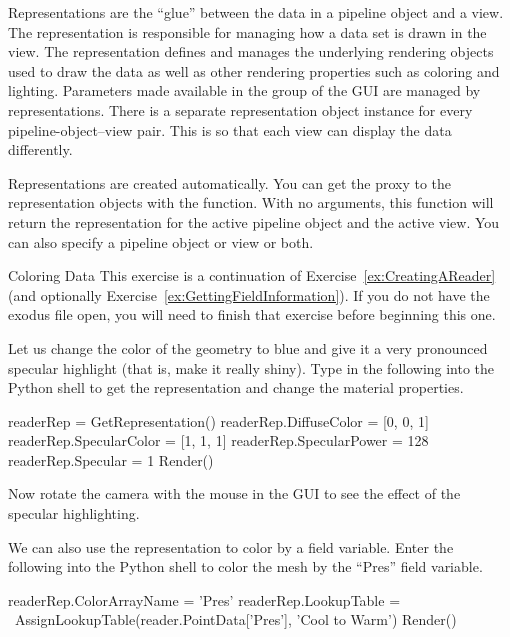 Representations are the ``glue'' between the data in a pipeline object and
a view.  The representation is responsible for managing how a data set is
drawn in the view.  The representation defines and manages the underlying
rendering objects used to draw the data as well as other rendering
properties such as coloring and lighting.  Parameters made available in the
 group of the GUI are managed by representations.  There is a
separate representation object instance for every pipeline-object--view
pair.  This is so that each view can display the data differently.

Representations are created automatically.  You can get the
proxy to the representation objects with the
 function.  With no arguments, this function will
return the representation for the active pipeline object and the active
view.  You can also specify a pipeline object or view or both.

\begin{exercise}{Coloring Data}
  \label{ex:ColoringData}%
  This exercise is a continuation of Exercise~\ref{ex:CreatingAReader} (and
  optionally Exercise~\ref{ex:GettingFieldInformation}).  If you do not
  have the exodus file open, you will need to finish that exercise before
  beginning this one.

  Let us change the color of the geometry to blue and give it a very
  pronounced specular highlight (that is, make it
  really shiny).  Type in the following into the Python shell
  to get the representation and change the material properties.

  \begin{python}
readerRep = GetRepresentation()
readerRep.DiffuseColor = [0, 0, 1]
readerRep.SpecularColor = [1, 1, 1]
readerRep.SpecularPower = 128
readerRep.Specular = 1
Render()
  \end{python}

  Now rotate the camera with the mouse in the GUI to see the effect of the
  specular highlighting.

  We can also use the representation to color by a field variable.  Enter
  the following into the Python shell to color the mesh by the ``Pres''
  field variable.

  \begin{python}
readerRep.ColorArrayName = 'Pres'
readerRep.LookupTable = \
  AssignLookupTable(reader.PointData['Pres'], 'Cool to Warm')
Render()
  \end{python}
\end{exercise}




